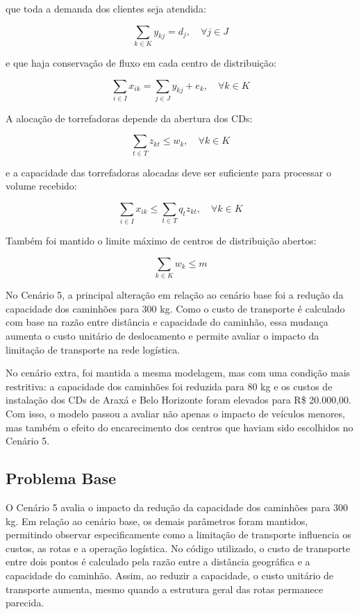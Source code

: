 \documentclass[a4paper,11pt]{article}
\begin{document}
que toda a demanda dos clientes seja atendida:

\begin{equation*}
\sum_{k \in K} y_{kj} = d_j, \quad \forall j \in J
\end{equation*}

e que haja conservação de fluxo em cada centro de distribuição:

\begin{equation*}
\sum_{i \in I} x_{ik} =
\sum_{j \in J} y_{kj} + e_k,
\quad \forall k \in K
\end{equation*}

A alocação de torrefadoras depende da abertura dos CDs:

\begin{equation*}
\sum_{t \in T} z_{kt} \leq w_k,
\quad \forall k \in K
\end{equation*}

e a capacidade das torrefadoras alocadas deve ser suficiente para processar o volume recebido:

\begin{equation*}
\sum_{i \in I} x_{ik}
\leq
\sum_{t \in T} q_tz_{kt},
\quad \forall k \in K
\end{equation*}

Também foi mantido o limite máximo de centros de distribuição abertos:

\begin{equation*}
\sum_{k \in K} w_k \leq m
\end{equation*}

No Cenário 5, a principal alteração em relação ao cenário base foi a redução da capacidade dos caminhões para 300 kg. Como o custo de transporte é calculado com base na razão entre distância e capacidade do caminhão, essa mudança aumenta o custo unitário de deslocamento e permite avaliar o impacto da limitação de transporte na rede logística.

No cenário extra, foi mantida a mesma modelagem, mas com uma condição mais restritiva: a capacidade dos caminhões foi reduzida para 80 kg e os custos de instalação dos CDs de Araxá e Belo Horizonte foram elevados para R\$ 20.000,00. Com isso, o modelo passou a avaliar não apenas o impacto de veículos menores, mas também o efeito do encarecimento dos centros que haviam sido escolhidos no Cenário 5.
\subsection{ Problema Base}
O Cenário 5 avalia o impacto da redução da capacidade dos caminhões para 300 kg. Em relação ao cenário base, os demais parâmetros foram mantidos, permitindo observar especificamente como a limitação de transporte influencia os custos, as rotas e a operação logística. No código utilizado, o custo de transporte entre dois pontos é calculado pela razão entre a distância geográfica e a capacidade do caminhão. Assim, ao reduzir a capacidade, o custo unitário de transporte aumenta, mesmo quando a estrutura geral das rotas permanece parecida.
\end{document}

